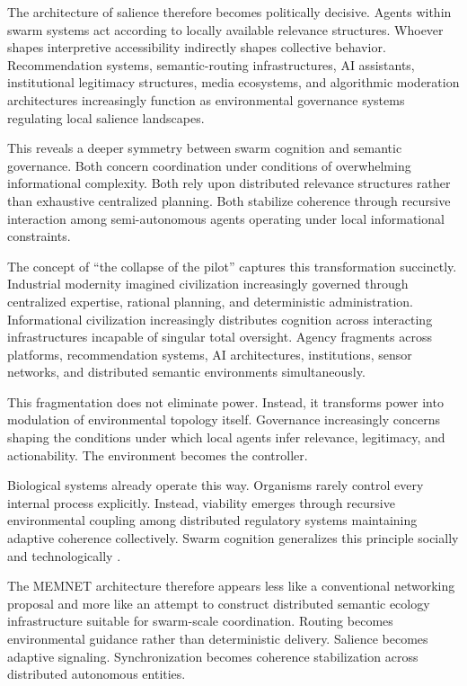 \documentclass[11pt,a4paper]{article}
\begin{document}
The architecture of salience therefore becomes politically decisive. Agents within swarm systems act according to locally available relevance structures. Whoever shapes interpretive accessibility indirectly shapes collective behavior. Recommendation systems, semantic-routing infrastructures, AI assistants, institutional legitimacy structures, media ecosystems, and algorithmic moderation architectures increasingly function as environmental governance systems regulating local salience landscapes.

This reveals a deeper symmetry between swarm cognition and semantic governance. Both concern coordination under conditions of overwhelming informational complexity. Both rely upon distributed relevance structures rather than exhaustive centralized planning. Both stabilize coherence through recursive interaction among semi-autonomous agents operating under local informational constraints.

The concept of ``the collapse of the pilot'' captures this transformation succinctly. Industrial modernity imagined civilization increasingly governed through centralized expertise, rational planning, and deterministic administration. Informational civilization increasingly distributes cognition across interacting infrastructures incapable of singular total oversight. Agency fragments across platforms, recommendation systems, AI architectures, institutions, sensor networks, and distributed semantic environments simultaneously.

This fragmentation does not eliminate power. Instead, it transforms power into modulation of environmental topology itself. Governance increasingly concerns shaping the conditions under which local agents infer relevance, legitimacy, and actionability. The environment becomes the controller.

Biological systems already operate this way. Organisms rarely control every internal process explicitly. Instead, viability emerges through recursive environmental coupling among distributed regulatory systems maintaining adaptive coherence collectively. Swarm cognition generalizes this principle socially and technologically \cite{theraulaz1999}.

The MEMNET architecture therefore appears less like a conventional networking proposal and more like an attempt to construct distributed semantic ecology infrastructure suitable for swarm-scale coordination. Routing becomes environmental guidance rather than deterministic delivery. Salience becomes adaptive signaling. Synchronization becomes coherence stabilization across distributed autonomous entities.
\end{document}
